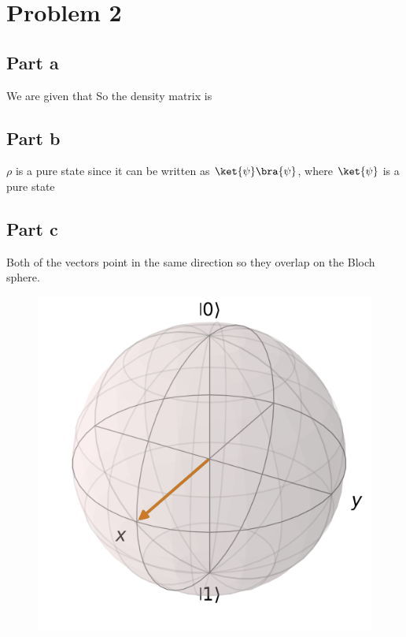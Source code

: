 \pagebreak
\section*{Problem 2}
\subsection*{Part a}
We are given that
So the density matrix is
\subsection*{Part b}
$\rho$ is a pure state since it can be written as $\ket{\psi}\bra{\psi}$, where $\ket{\psi}$ is a pure state
\subsection*{Part c}
Both of the vectors point in the same direction so they overlap on the Bloch sphere.
\begin{figure}[H]
    \centering
    \includegraphics[width=0.75\linewidth]{Resources//245//Homework 9/245 Homework 9 Problem 2c.png}
    \label{fig:enter-label}
\end{figure}

